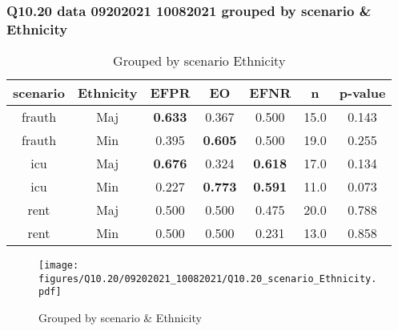 \subsubsection{Q10.20 data 09202021 10082021 grouped by scenario \& Ethnicity}

\begin{comment}
                   EFPR        EO      EFNR     n    pvalue
(frauth, Maj)  0.633333  0.366667  0.500000  15.0  0.142639
(frauth, Min)  0.394737  0.605263  0.500000  19.0  0.254678
(icu, Maj)     0.676471  0.323529  0.617647  17.0  0.134228
(icu, Min)     0.227273  0.772727  0.590909  11.0  0.073240
(rent, Maj)    0.500000  0.500000  0.475000  20.0  0.788343
(rent, Min)    0.500000  0.500000  0.230769  13.0  0.858364
\end{comment}

\begin{table}[h]
    \centering
    \begin{tabular}{|c|c|c|c|c|c|c|}
        \hline
        scenario & Ethnicity & EFPR & EO & EFNR & n & p-value\\
        \hline
        frauth & Maj & \textbf{0.633} & 0.367 & 0.500 & 15.0 & 0.143\\
		frauth & Min & 0.395 & \textbf{0.605} & 0.500 & 19.0 & 0.255\\
		icu & Maj & \textbf{0.676} & 0.324 & \textbf{0.618} & 17.0 & 0.134\\
		icu & Min & 0.227 & \textbf{0.773} & \textbf{0.591} & 11.0 & 0.073\\
		rent & Maj & 0.500 & 0.500 & 0.475 & 20.0 & 0.788\\
		rent & Min & 0.500 & 0.500 & 0.231 & 13.0 & 0.858\\
		
        \hline
    \end{tabular}
    \caption{Grouped by scenario Ethnicity}
    \label{tab:my_label}
\end{table}
\begin{figure}[h]
    \centering
    \texttt{[image: figures/Q10.20/09202021\_10082021/Q10.20\_scenario\_Ethnicity.pdf]}
    \caption{Grouped by scenario \& Ethnicity}
    \label{fig:my_label}
\end{figure}
